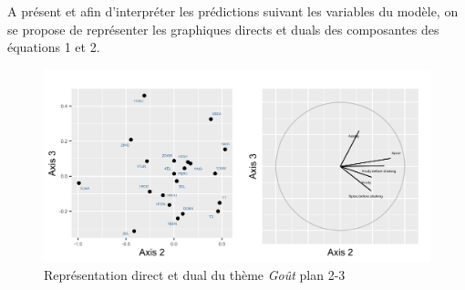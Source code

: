 \documentclass[a4paper,french,10pt]{article}
\begin{document}
\newpage

A présent et afin d'interpréter les prédictions suivant les variables du modèle, on se propose de représenter les graphiques directs et duals des composantes des équations 1 et 2.


\begin{figure}[htp] 
	\centering
	\hfill%
\end{figure}
\begin{figure}[htp] 
	\centering
	\includegraphics[scale=0.8]{images/Plot.IndVar_B3_2.3.png}
	\caption{Représentation direct et dual du thème \textit{Goût} plan 2-3}
\end{figure}
\end{document}
